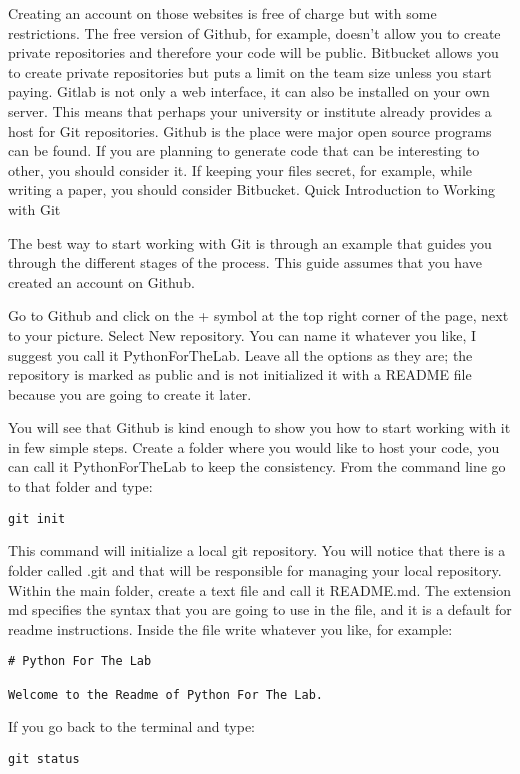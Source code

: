 Creating an account on those websites is free of charge but with some restrictions. The free version of Github, for example, doesn’t allow you to create private repositories and therefore your code will be public. Bitbucket allows you to create private repositories but puts a limit on the team size unless you start paying. Gitlab is not only a web interface, it can also be installed on your own server. This means that perhaps your university or institute already provides a host for Git repositories. Github is the place were major open source programs can be found. If you are planning to generate code that can be interesting to other, you should consider it. If keeping your files secret, for example, while writing a paper, you should consider Bitbucket.
Quick Introduction to Working with Git

The best way to start working with Git is through an example that guides you through the different stages of the process. This guide assumes that you have created an account on Github.

Go to Github and click on the + symbol at the top right corner of the page, next to your picture. Select New repository. You can name it whatever you like, I suggest you call it PythonForTheLab. Leave all the options as they are; the repository is marked as public and is not initialized it with a README file because you are going to create it later.

You will see that Github is kind enough to show you how to start working with it in few simple steps. Create a folder where you would like to host your code, you can call it PythonForTheLab to keep the consistency. From the command line go to that folder and type:
\begin{verbatim}
git init
\end{verbatim}
This command will initialize a local git repository. You will notice that there is a folder called .git and that will be responsible for managing your local repository. Within the main folder, create a text file and call it README.md. The extension md specifies the syntax that you are going to use in the file, and it is a default for readme instructions. Inside the file write whatever you like, for example:
\begin{verbatim}
# Python For The Lab

Welcome to the Readme of Python For The Lab. 
\end{verbatim}

If you go back to the terminal and type:
\begin{verbatim}
git status
\end{verbatim}

